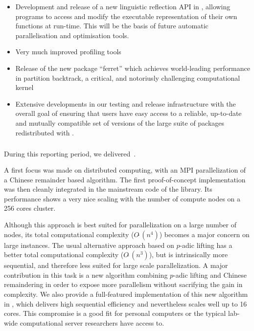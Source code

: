 \begin{itemize}
  \item Development and release of a new linguistic reflection API in \GAP, allowing \GAP programs to
    access and modify the executable representation of their own functions at run-time. This will be
    the basis of future automatic parallelisation and optimisation tools.
  \item Very much improved profiling tools
  \item Release of the new package ``ferret'' which achieves world-leading performance in partition
    backtrack, a critical, and notoriusly challenging computational kernel
  \item Extensive developments in our testing and release infrastructure with the overall goal of
    ensuring that \GAP users have easy access to a reliable, up-to-date and mutually compatible set of
    versions of the large suite of packages redistributed with \GAP.
\end{itemize}

\medskip
\subparagraph{}
  \label{hpc@hpc-linbox}

During this reporting period, we delivered~.

A first focus was made on distributed computing, with an MPI parallelization of a Chinese remainder based
algorithm. The first proof-of-concept implementation was then cleanly integrated in the mainstream code of the
library. Its performance shows a very nice scaling with the number of compute nodes on a 256 cores cluster.

Although this approach is best suited for parallelization on a large
number of nodes, its total computational complexity ($O{\tilde \ }(n^4)$) becomes
a major concern on large instances.
%
The usual alternative approach based on $p$-adic lifting has a better total computational complexity ($O{\tilde \ }(n^3)$), but is intrinsically more
sequential, and therefore less suited for large scale parallelization.
A major contribution in this task is a new algorithm combining $p$-adic lifting and Chinese remaindering in order to
expose more parallelism without sacrifying the gain in complexity.
We also provide a full-featured  implementation of this new algorithm in \Linbox, which delivers high
sequential efficiency and nevertheless scales well up to 16 cores.
This compromise is a good fit for personal computers or the typical
lab-wide computational server researchers have access to.

